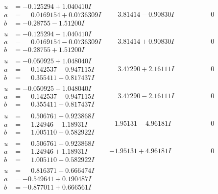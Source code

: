 \documentclass[1p]{elsarticle_modified}
\theoremstyle{definition}
\begin{document}
$$\begin{array}{c|c|c}
\begin{aligned}
u &= -0.125294 + 1.040410 I \\
a &= \phantom{-}0.0169154 + 0.0736309 I \\
b &= -0.28755 - 1.51200 I\end{aligned}
 & \phantom{-}3.81414 - 0.90830 I & \phantom{-0.000000 } 0 \\ \hline\begin{aligned}
u &= -0.125294 - 1.040410 I \\
a &= \phantom{-}0.0169154 - 0.0736309 I \\
b &= -0.28755 + 1.51200 I\end{aligned}
 & \phantom{-}3.81414 + 0.90830 I & \phantom{-0.000000 } 0 \\ \hline\begin{aligned}
u &= -0.050925 + 1.048040 I \\
a &= \phantom{-}0.142537 + 0.947115 I \\
b &= \phantom{-}0.355411 - 0.817437 I\end{aligned}
 & \phantom{-}3.47290 + 2.16111 I & \phantom{-0.000000 } 0 \\ \hline\begin{aligned}
u &= -0.050925 - 1.048040 I \\
a &= \phantom{-}0.142537 - 0.947115 I \\
b &= \phantom{-}0.355411 + 0.817437 I\end{aligned}
 & \phantom{-}3.47290 - 2.16111 I & \phantom{-0.000000 } 0 \\ \hline\begin{aligned}
u &= \phantom{-}0.506761 + 0.923868 I \\
a &= \phantom{-}1.24946 - 1.18931 I \\
b &= \phantom{-}1.005110 + 0.582922 I\end{aligned}
 & -1.95131 - 4.96181 I & \phantom{-0.000000 } 0 \\ \hline\begin{aligned}
u &= \phantom{-}0.506761 - 0.923868 I \\
a &= \phantom{-}1.24946 + 1.18931 I \\
b &= \phantom{-}1.005110 - 0.582922 I\end{aligned}
 & -1.95131 + 4.96181 I & \phantom{-0.000000 } 0 \\ \hline\begin{aligned}
u &= \phantom{-}0.816371 + 0.666474 I \\
a &= -0.549641 + 0.190487 I \\
b &= -0.877011 + 0.666561 I\end{aligned}

\end{array}$$
\end{document}
